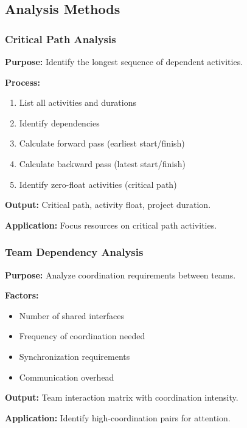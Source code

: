 \documentclass[11pt,letterpaper]{article}
\begin{document}
\subsection{Analysis Methods}

\subsubsection{Critical Path Analysis}

\begin{definitionbox}
\textbf{Purpose:} Identify the longest sequence of dependent activities.

\textbf{Process:}
\begin{enumerate}[nosep]
    \item List all activities and durations
    \item Identify dependencies
    \item Calculate forward pass (earliest start/finish)
    \item Calculate backward pass (latest start/finish)
    \item Identify zero-float activities (critical path)
\end{enumerate}

\textbf{Output:} Critical path, activity float, project duration.

\textbf{Application:} Focus resources on critical path activities.
\end{definitionbox}

\subsubsection{Team Dependency Analysis}

\begin{definitionbox}
\textbf{Purpose:} Analyze coordination requirements between teams.

\textbf{Factors:}
\begin{itemize}[nosep]
    \item Number of shared interfaces
    \item Frequency of coordination needed
    \item Synchronization requirements
    \item Communication overhead
\end{itemize}

\textbf{Output:} Team interaction matrix with coordination intensity.

\textbf{Application:} Identify high-coordination pairs for attention.
\end{definitionbox}
\end{document}
